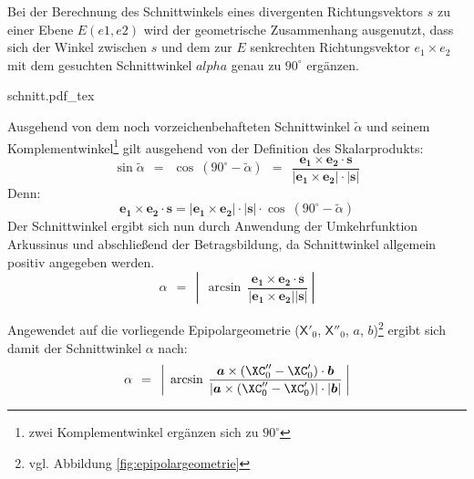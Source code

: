 \begin{mdframed}[linewidth=1pt,leftmargin=1cm,rightmargin=1cm]
	{\noindent}Bei der Berechnung des Schnittwinkels eines divergenten Richtungsvektors $s$ zu einer Ebene $E (e1, e2)$ wird der geometrische Zusammenhang ausgenutzt, dass sich der Winkel zwischen $s$ und dem zur $E$ senkrechten Richtungsvektor $e_1 \times e_2$ mit dem gesuchten Schnittwinkel $alpha$ genau zu $90^\circ$ ergänzen.\kleinerabstand
	
	\begin{center}
		\def\svgwidth{7cm}
		{schnitt.pdf_tex}
	\end{center}
	
	Ausgehend von dem noch vorzeichenbehafteten Schnittwinkel $\tilde{\alpha}$ und seinem Komplementwinkel\footnote{zwei Komplementwinkel ergänzen sich zu $90^\circ$} gilt ausgehend von der Definition des Skalarprodukts:
	\begin{equation}
		\sin\tilde{\alpha} \:\:=\:\: \cos\:(90^\circ-\tilde{\alpha}) \:\:=\:\: \frac{\boldsymbol{e_1}\times\boldsymbol{e_2} \cdot\boldsymbol{s}}{|\boldsymbol{e_1}\times\boldsymbol{e_2}|\cdot|\boldsymbol{s}|}
	\end{equation}
	Denn:
	\begin{equation}
		\boldsymbol{e_1}\times\boldsymbol{e_2} \cdot\boldsymbol{s} = |\boldsymbol{e_1}\times\boldsymbol{e_2}|\cdot|\boldsymbol{s}| \cdot\cos\:(90^\circ-\tilde{\alpha})
	\end{equation}
	Der Schnittwinkel ergibt sich nun durch Anwendung der Umkehrfunktion Arkussinus und abschließend der Betragsbildung, da Schnittwinkel allgemein positiv angegeben werden.
	\begin{equation}
		\alpha \:\:=\:\: \left|\:\: \arcsin\:\frac{\boldsymbol{e_1}\times\boldsymbol{e_2} \cdot\boldsymbol{s}}{|\boldsymbol{e_1}\times\boldsymbol{e_2}| |\boldsymbol{s}|} \:\right|
	\end{equation}
\end{mdframed}

{\noindent}Angewendet auf die vorliegende Epipolargeometrie ($\mathsf{X}'_0$, $\mathsf{X}''_0$, $a$, $b$)\footnote{vgl. Abbildung \ref{fig:epipolargeometrie}} ergibt sich damit der Schnittwinkel $\alpha$ nach:
\begin{equation}
	\alpha \:\:=\:\: \left|\:\: \arcsin\:\frac{\boldsymbol{a}\times(\XC''_0-\XC'_0) \cdot\boldsymbol{b}}{|\boldsymbol{a}\times(\XC''_0-\XC'_0)|\cdot|\boldsymbol{b}|} \:\right|
\end{equation}


